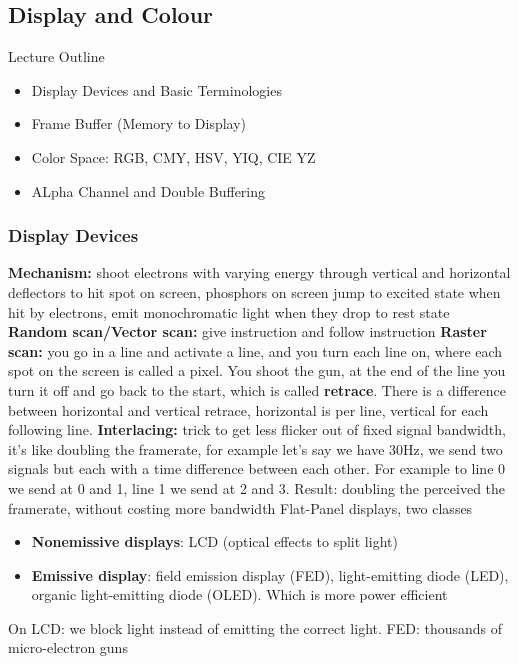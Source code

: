 \documentclass[11pt]{article}
\begin{document}
\subsection{Display and Colour}
Lecture Outline
\begin{itemize}
    \item Display Devices and Basic Terminologies
    \item Frame Buffer (Memory to Display)
    \item Color Space: RGB, CMY, HSV, YIQ, CIE YZ
    \item ALpha Channel and Double Buffering
\end{itemize}

\subsubsection{Display Devices}
\textbf{Mechanism:}  shoot electrons with varying energy through vertical and horizontal deflectors to hit spot on screen, phosphors on screen jump to excited state when hit by electrons, emit monochromatic light when they drop to rest state
\newline
\textbf{Random scan/Vector scan:}  give instruction and follow instruction
\newline
\textbf{Raster scan:}  you go in a line and activate a line, and you turn each line on, where each spot on the screen is called a pixel. You shoot the gun, at the end of the line you turn it off and go back to the start, which is called \textbf{retrace}. There is a difference between horizontal and vertical retrace, horizontal is per line, vertical for each following line.
\newline
\textbf{Interlacing:} trick to get less flicker out of fixed signal bandwidth, it's like doubling the framerate, for example let's say we have 30Hz, we send two signals but each with a time difference between each other. For example to line 0 we send at 0 and 1, line 1 we send at 2 and 3. 
Result: doubling the perceived the framerate, without costing more bandwidth
\newline
Flat-Panel displays, two classes
\begin{itemize}
    \item \textbf{Nonemissive displays}: LCD (optical effects to split light)
    \item \textbf{Emissive display}: field emission display (FED), light-emitting diode (LED), organic light-emitting diode (OLED). Which is more power efficient
\end{itemize}
\noindent
On LCD: we block light instead of emitting the correct light.
\newline
FED: thousands of micro-electron guns
\end{document}
